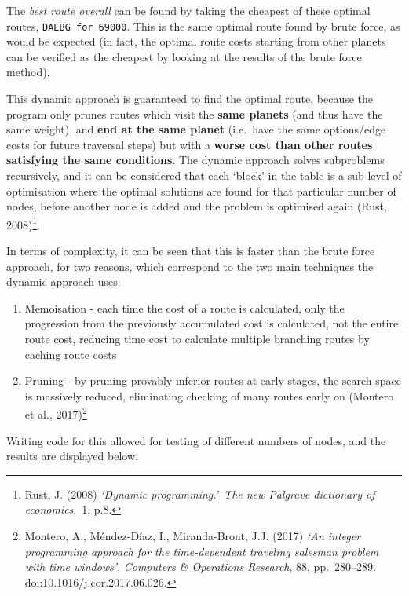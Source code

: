 \documentclass[
]{article}
\begin{document}
The \emph{best route overall} can be found by taking the cheapest of
these optimal routes, \texttt{DAEBG\ for\ 69000}. This is the same
optimal route found by brute force, as would be expected (in fact, the
optimal route costs starting from other planets can be verified as the
cheapest by looking at the results of the brute force method).

This dynamic approach is guaranteed to find the optimal route, because
the program only prunes routes which visit the \textbf{same planets}
(and thus have the same weight), and \textbf{end at the same planet}
(i.e.~have the same options/edge costs for future traversal steps) but
with a \textbf{worse cost than other routes satisfying the same
conditions}. The dynamic approach solves subproblems recursively, and it
can be considered that each `block' in the table is a sub-level of
optimisation where the optimal solutions are found for that particular
number of nodes, before another node is added and the problem is
optimised again (Rust, 2008)\footnote{Rust, J. (2008) \emph{`Dynamic
  programming.'}~\emph{The new Palgrave dictionary of economics},~1,
  p.8.}.

In terms of complexity, it can be seen that this is faster than the
brute force approach, for two reasons, which correspond to the two main
techniques the dynamic approach uses:

\begin{enumerate}
\def\labelenumi{\arabic{enumi}.}
\item
  Memoisation - each time the cost of a route is calculated, only the
  progression from the previously accumulated cost is calculated, not
  the entire route cost, reducing time cost to calculate multiple
  branching routes by caching route costs
\item
  Pruning - by pruning provably inferior routes at early stages, the
  search space is massively reduced, eliminating checking of many routes
  early on (Montero et al., 2017)\footnote{Montero, A., Méndez-Díaz, I.,
    Miranda-Bront, J.J. (2017) \emph{`An integer programming approach
    for the time-dependent traveling salesman problem with time
    windows'}, \emph{Computers \& Operations Research}, 88,
    pp.~280--289. doi:10.1016/j.cor.2017.06.026.}
\end{enumerate}

Writing code for this allowed for testing of different numbers of nodes,
and the results are displayed below.
\end{document}
